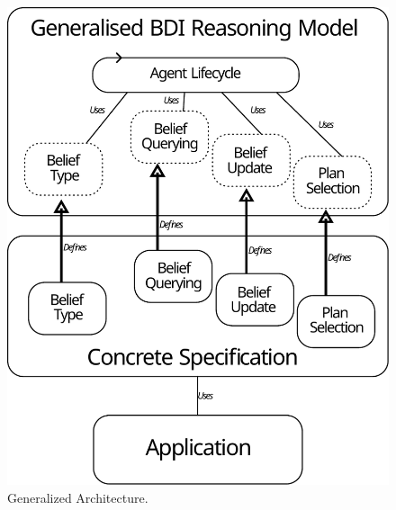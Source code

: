 \documentclass[
]{ceurart}
\begin{document}
\begin{figure}
    \centering
    \caption{Generalized Architecture.}
    \label{fig:generalized-bdi-architecture}
    \includegraphics[width=\linewidth]{figures/architecture.pdf}
\end{figure}
\end{document}
